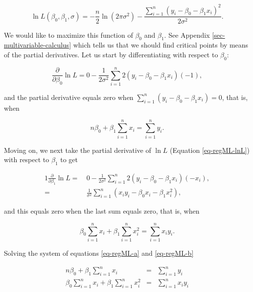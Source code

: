 \documentclass[]{book}
\numberwithin{equation}{chapter}
\numberwithin{figure}{chapter}
\theoremstyle{plain}
\theoremstyle{definition}
\theoremstyle{remark}
\theoremstyle{definition}
\theoremstyle{definition}
\theoremstyle{remark}
\begin{document}
\begin{equation}
\label{eq-regML-lnL}
\ln L(\beta_{0},\beta_{1},\sigma)=-\frac{n}{2}\ln(2\pi\sigma^{2})-\frac{\sum_{i=1}^{n}(y_{i}-\beta_{0}-\beta_{1}x_{i})^{2}}{2\sigma^{2}}.
\end{equation}

We would like to maximize this function of \(\beta_{0}\) and
\(\beta_{1}\). See Appendix \ref{sec-multivariable-calculus} which tells
us that we should find critical points by means of the partial
derivatives. Let us start by differentiating with respect to
\(\beta_{0}\):

\begin{equation}
\frac{\partial}{\partial\beta_{0}}\ln L=0-\frac{1}{2\sigma^{2}}\sum_{i=1}^{n}2(y_{i}-\beta_{0}-\beta_{1}x_{i})(-1),
\end{equation}

and the partial derivative equals zero when
\(\sum_{i=1}^{n}(y_{i}-\beta_{0}-\beta_{1}x_{i}) = 0\), that is, when

\begin{equation}
\label{eq-regML-a}
n \beta_{0} + \beta_{1} \sum_{i=1}^{n} x_{i} = \sum_{i = 1}^{n}y_{i}.
\end{equation}

Moving on, we next take the partial derivative of \(\ln L\) (Equation
\eqref{eq-regML-lnL}) with respect to \(\beta_{1}\) to get

\begin{alignat}{1}
\frac{\partial}{\partial \beta_{1}} \ln L = \ & 0 - \frac{1}{2\sigma^{2}} \sum_{i=1}^{n} 2 (y_{i} - \beta_{0} - \beta_{1} x_{i})(-x_{i}),\\ = & \frac{1}{\sigma^{2}}\sum_{i = 1}^{n}\left(x_{i} y_{i} - \beta_{0}x_{i} - \beta_{1}x_{i}^{2}\right),
\end{alignat}

and this equals zero when the last sum equals zero, that is, when

\begin{equation}
\label{eq-regML-b}
\beta_{0} \sum_{i = 1}^{n}x_{i} + \beta_{1} \sum_{i = 1}^{n}x_{i}^{2} = \sum_{i = 1}^{n}x_{i}y_{i}.
\end{equation}

Solving the system of equations \eqref{eq-regML-a} and
\eqref{eq-regML-b}

\begin{eqnarray}
n\beta_{0} + \beta_{1}\sum_{i = 1}^{n}x_{i} & = & \sum_{i = 1}^{n}y_{i}\\
\beta_{0}\sum_{i = 1}^{n}x_{i}+\beta_{1}\sum_{i = 1}^{n}x_{i}^{2} & = & \sum_{i = 1}^{n}x_{i}y_{i}
\end{eqnarray}
\end{document}
